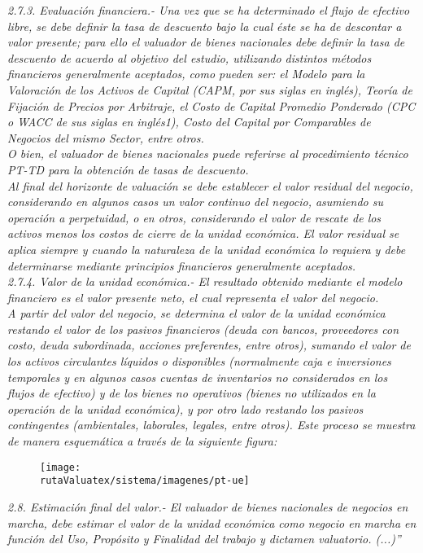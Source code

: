 \textit{\textcolor{principal}{2.7.3. Evaluaci\'on financiera}.- Una vez que se ha determinado el flujo de efectivo libre, se debe definir la tasa de descuento bajo la cual \'este se ha de descontar a valor presente; para ello el valuador de bienes nacionales debe definir la tasa de descuento de acuerdo al objetivo del estudio, utilizando distintos m\'etodos financieros generalmente aceptados, como pueden ser: el Modelo para la Valoraci\'on de los Activos de Capital (CAPM, por sus siglas en ingl\'es), Teor\'ia de Fijaci\'on de Precios por Arbitraje, el Costo de Capital Promedio Ponderado (CPC o WACC de sus siglas en ingl\'es1), Costo del Capital por Comparables de Negocios del mismo Sector, entre otros.}\\
\textit{O bien, el valuador de bienes nacionales puede referirse al procedimiento t\'ecnico PT-TD para la obtenci\'on de tasas de descuento.}\\
\textit{Al final del horizonte de valuaci\'on se debe establecer el valor residual del negocio, considerando en algunos casos un valor continuo del negocio, asumiendo su operaci\'on a perpetuidad, o en otros, considerando el valor de rescate de los activos menos los costos de cierre de la unidad econ\'omica. El valor residual se aplica siempre y cuando la naturaleza de la unidad econ\'omica lo requiera y debe determinarse mediante principios financieros generalmente aceptados.}\\

\textit{\textcolor{principal}{2.7.4. Valor de la unidad econ\'omica}.- El resultado obtenido mediante el modelo financiero es el valor presente neto, el cual representa el valor del negocio.}\\
\textit{A partir del valor del negocio, se determina el valor de la unidad econ\'omica restando el valor de los pasivos financieros (deuda con bancos, proveedores con costo, deuda subordinada, acciones preferentes, entre otros), sumando el valor de los activos circulantes l\'iquidos o disponibles (normalmente caja e inversiones temporales y en algunos casos cuentas de inventarios no considerados en los flujos de efectivo) y de los bienes no operativos (bienes no utilizados en la operaci\'on de la unidad econ\'omica), y por otro lado restando los pasivos contingentes (ambientales, laborales, legales, entre otros). Este proceso se muestra de manera esquem\'atica a trav\'es de la siguiente figura:}\\

\begin{figure}[H]
\centering
\texttt{[image: \\rutaValuatex/sistema/imagenes/pt-ue]}
\end{figure}

\textit{\textcolor{principal}{2.8. Estimaci\'on final del valor}.- El valuador de bienes nacionales de negocios en marcha, debe estimar el valor de la unidad econ\'omica como negocio en marcha en funci\'on del Uso, Prop\'osito y Finalidad del trabajo y dictamen valuatorio. (...)''}\\

